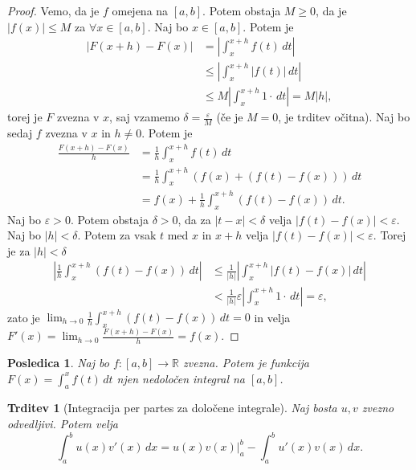 \documentclass[10pt, a4paper]{article}
\newtheorem{posledica}[izr]{Posledica}
\newtheorem{trditev}[izr]{Trditev}
\newenvironment{noticeC}{%
  \tcolorbox[%
  notitle,
  empty,
  enhanced,  %
  breakable,
  coltext=black, 
  fontupper=\rmfamily,
  noparskip,
  sharp corners,
  boxrule=-1pt,  %
  frame hidden,
  left=7pt,  %
  right=7pt,
  top=5pt,
  bottom=5pt,
  before skip=2.5ex plus 2pt,
  after skip=2.5ex plus 2pt,
  overlay unbroken and last={%
  },
  ]}
{\endtcolorbox}
\newenvironment{dokaz}%
  {\begin{noticeC}\begin{proof}}%
  {\end{proof}\end{noticeC}}
\newcommand{\R}{\mathbb {R}}
\newcommand{\limf}[3]{\lim_{#1 \to #2} {#3}}
\begin{document}
\begin{dokaz}
    Vemo, da je $f$ omejena na $[a, b].$ Potem obstaja $M \geq 0$, da je $|f(x)| \leq M$ za $\forall x \in [a, b]$.
    Naj bo $x \in [a, b].$ Potem je 
    \begin{align*}
        \left| F(x+h) - F(x) \right| &= \left| \int_x ^{x+h} f(t)\,dt \right|\\
        &\leq \left| \int_x ^{x+h} |f(t)|\,dt \right|\\
        &\leq M \left| \int_x ^{x+h} 1 \cdot\,dt \right| = M |h|,
    \end{align*}
    torej je $F$ zvezna v $x$, saj vzamemo $\delta = \frac{\varepsilon}{M}$ (če je $M = 0$, je trditev očitna).
    Naj bo sedaj $f$ zvezna v $x$ in $h \neq 0$. Potem je 
    \begin{align*}
        \frac{F(x+h) - F(x)}{h} &= \frac{1}{h} \int_{x} ^{x+h} f(t)\,dt\\
        &= \frac{1}{h} \int_{x} ^{x+h} (f(x) + (f(t) - f(x)))\,dt\\
        &= f(x) + \frac{1}{h} \int_{x} ^{x+h} (f(t) - f(x))\,dt.
    \end{align*}
    Naj bo $\varepsilon > 0.$ Potem obstaja $\delta > 0$, da za $|t-x| < \delta$ velja $|f(t) - f(x)| < \varepsilon.$
    Naj bo $|h| < \delta.$ Potem za vsak $t$ med $x$ in $x + h$ velja $|f(t) - f(x)| < \varepsilon$.
    Torej je za $|h| < \delta$
    \begin{align*}
        \left| \frac{1}{h} \int_x ^{x+h} (f(t) - f(x))\,dt \right| &\leq \frac{1}{|h|} \left| \int_x ^{x+h} |f(t) - f(x)|\,dt \right| \\
        &< \frac{1}{|h|} \varepsilon \left| \int_x ^{x+h} 1 \cdot\,dt \right| = \varepsilon,
    \end{align*}
    zato je $\limf{h}{0}{\frac{1}{h} \int_x ^{x+h} (f(t) - f(x))\,dt} = 0$ in velja $F'(x) = \limf{h}{0}{\frac{F(x+h) - F(x)}{h}} = f(x).$
\end{dokaz}

\begin{posledica}
    Naj bo $f: [a, b] \rightarrow \R$ zvezna. Potem je funkcija $F(x) = \int_a ^x f(t)\,dt$ njen nedoločen integral na $[a, b]$.
\end{posledica}

\begin{trditev}[Integracija per partes za določene integrale]
    Naj bosta $u, v$ zvezno odvedljivi.
    Potem velja $$\int_a ^b u(x) v'(x)\,dx = u(x) v(x) \Big| _a ^b - \int_a ^b u'(x) v(x)\,dx.$$
\end{trditev}
\end{document}
